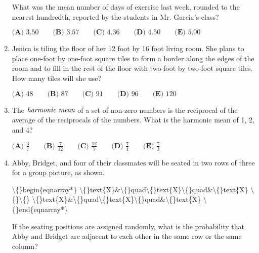 \documentclass{article}
\begin{document}
\begin{enumerate}[label=\arabic*., itemsep=0.5em]
What was the mean number of days of exercise last week, rounded to the nearest hundredth, reported by the students in Mr. Garcia's class?

\(\textbf{(A) } 3.50 \qquad \textbf{(B) } 3.57 \qquad \textbf{(C) } 4.36 \qquad \textbf{(D) } 4.50 \qquad \textbf{(E) } 5.00\)\par \vspace{0.5em}\item Jenica is tiling the floor of her 12 foot by 16 foot living room. She plans to place one-foot by one-foot square tiles to form a border along the edges of the room and to fill in the rest of the floor with two-foot by two-foot square tiles. How many tiles will she use?

\(\textbf{(A) }48\qquad\textbf{(B) }87\qquad\textbf{(C) }91\qquad\textbf{(D) }96\qquad \textbf{(E) }120\)\par \vspace{0.5em}\item The \(\emph{harmonic mean}\) of a set of non-zero numbers is the reciprocal of the average of the reciprocals of the numbers. What is the harmonic mean of 1, 2, and 4?

\(\textbf{(A) }\frac{3}{7}\qquad\textbf{(B) }\frac{7}{12}\qquad\textbf{(C) }\frac{12}{7}\qquad\textbf{(D) }\frac{7}{4}\qquad \textbf{(E) }\frac{7}{3}\)\par \vspace{0.5em}\item Abby, Bridget, and four of their classmates will be seated in two rows of three for a group picture, as shown.


\textbackslash\{\}begin\{eqnarray*\}
\textbackslash\{\}text\{X\}\&\textbackslash\{\}quad\textbackslash\{\}text\{X\}\textbackslash\{\}quad\&\textbackslash\{\}text\{X\} \textbackslash\{\}\textbackslash\{\}
\textbackslash\{\}text\{X\}\&\textbackslash\{\}quad\textbackslash\{\}text\{X\}\textbackslash\{\}quad\&\textbackslash\{\}text\{X\} 
\textbackslash\{\}end\{eqnarray*\}


If the seating positions are assigned randomly, what is the probability that Abby and Bridget are adjacent to each other in the same row or the same column?


\end{enumerate}
\end{document}
